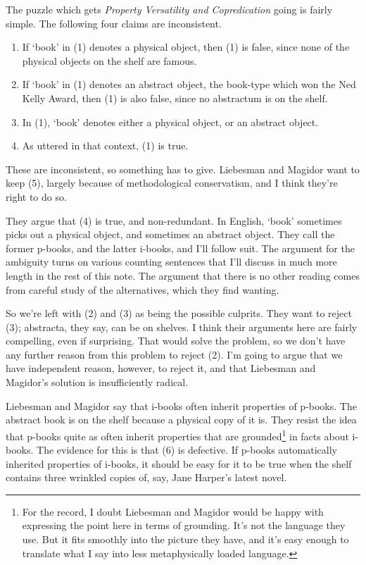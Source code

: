 \documentclass[
  11pt,
  letterpaper,
  DIV=11,
  numbers=noendperiod,
  twoside]{scrartcl}
\newcounter{none} %
\providecommand{\tightlist}{%
  \setlength{\itemsep}{0pt}\setlength{\parskip}{0pt}}
\begin{document}
The puzzle which gets \emph{Property Versatility and Copredication}
going is fairly simple. The following four claims are inconsistent.

\begin{enumerate}
\def\labelenumi{(\arabic{enumi})}
\setcounter{enumi}{1}
\tightlist
\item
  If `book' in (1) denotes a physical object, then (1) is false, since
  none of the physical objects on the shelf are famous.
\item
  If `book' in (1) denotes an abstract object, the book-type which won
  the Ned Kelly Award, then (1) is also false, since no abstractum is on
  the shelf.
\item
  In (1), `book' denotes either a physical object, or an abstract
  object.
\item
  As uttered in that context, (1) is true.
\end{enumerate}

These are inconsistent, so something has to give. Liebesman and Magidor
want to keep (5), largely because of methodological conservatism, and I
think they're right to do so.

They argue that (4) is true, and non-redundant. In English, `book'
sometimes picks out a physical object, and sometimes an abstract object.
They call the former p-books, and the latter i-books, and I'll follow
suit. The argument for the ambiguity turns on various counting sentences
that I'll discuss in much more length in the rest of this note. The
argument that there is no other reading comes from careful study of the
alternatives, which they find wanting.

So we're left with (2) and (3) as being the possible culprits. They want
to reject (3); abstracta, they say, can be on shelves. I think their
arguments here are fairly compelling, even if surprising. That would
solve the problem, so we don't have any further reason from this problem
to reject (2). I'm going to argue that we have independent reason,
however, to reject it, and that Liebesman and Magidor's solution is
insufficiently radical.

Liebesman and Magidor say that i-books often inherit properties of
p-books. The abstract book is on the shelf because a physical copy of it
is. They resist the idea that p-books quite as often inherit properties
that are grounded\footnote{For the record, I doubt Liebesman and Magidor
  would be happy with expressing the point here in terms of grounding.
  It's not the language they use. But it fits smoothly into the picture
  they have, and it's easy enough to translate what I say into less
  metaphysically loaded language.} in facts about i-books. The evidence
for this is that (6) is defective. If p-books automatically inherited
properties of i-books, it should be easy for it to be true when the
shelf contains three wrinkled copies of, say, Jane Harper's latest
novel.
\end{document}
